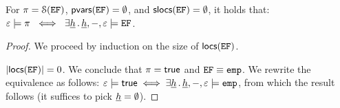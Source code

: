 \begin{lemma}\label{sanity}
For $\pi = {\cal S}(\mathtt{EF})$, ${\sf pvars}(\mathtt{EF}) = \emptyset$, and ${\sf slocs}(\mathtt{EF}) = \emptyset$, 
it holds that: 
$\varepsilon \models \pi  \ \iff \ \exists \underline{h} \, . \, \underline{h}, -, \varepsilon \models \mathtt{EF}$.
\end{lemma}
\begin{proof}
We proceed by induction on the size of ${\sf locs}(\mathtt{EF})$. 
\vspace{6pt}

\noindent{}  $\vert {\sf locs}(\mathtt{EF}) \vert = 0$. We conclude that $\pi = {\sf true}$ 
and $\mathtt{EF} \equiv \texttt{emp}$. We rewrite the equivalence as follows: 
$
 \varepsilon \models {\sf true}  \iff  \exists \underline{h} \, . \, \underline{h}, -, \varepsilon \models \texttt{emp}
$,
from which the result follows (it suffices to pick $\underline{h} = \emptyset$). 
\vspace{6pt}


\end{proof}
